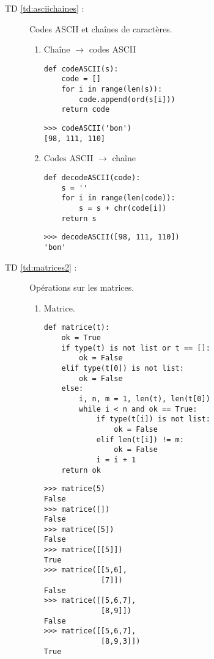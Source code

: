 \begin{description}
\item[TD \ref{td:asciichaines} :] Codes ASCII et chaînes de caractères.
\begin{enumerate}
\item Chaîne $\rightarrow$ codes ASCII
	
\begin{py}{6cm}
\begin{verbatim}
def codeASCII(s):
    code = []
    for i in range(len(s)):
        code.append(ord(s[i]))
    return code
\end{verbatim}
\end{py}
\hfill
\begin{py}{6cm}
\begin{verbatim}
>>> codeASCII('bon')
[98, 111, 110]
\end{verbatim}
\end{py}
\vspace*{2mm}

\item Codes ASCII $\rightarrow$ chaîne

\begin{py}{6cm}
\begin{verbatim}
def decodeASCII(code):
    s = ''
    for i in range(len(code)):
        s = s + chr(code[i])
    return s
\end{verbatim}
\end{py}
\hfill
\begin{py}{6cm}
\begin{verbatim}
>>> decodeASCII([98, 111, 110])
'bon'
\end{verbatim}
\end{py}
\vspace*{2mm}

\end{enumerate}

\item[TD \ref{td:matrices2} :] Opérations sur les matrices.\\
\begin{enumerate}
\item Matrice.

\begin{py}{6cm}
\begin{verbatim}
def matrice(t):
    ok = True
    if type(t) is not list or t == []:
        ok = False
    elif type(t[0]) is not list: 
        ok = False
    else:
        i, n, m = 1, len(t), len(t[0])
        while i < n and ok == True:
            if type(t[i]) is not list:
                ok = False
            elif len(t[i]) != m: 
                ok = False
            i = i + 1
    return ok
\end{verbatim}
\end{py}
\hfill
\begin{py}{6cm}
\begin{verbatim}
>>> matrice(5)
False
>>> matrice([])
False
>>> matrice([5])
False
>>> matrice([[5]])
True
>>> matrice([[5,6],
             [7]])
False
>>> matrice([[5,6,7],
             [8,9]])
False
>>> matrice([[5,6,7],
             [8,9,3]])
True
\end{verbatim}
\end{py}
\vspace*{2mm}


\end{enumerate}
\end{description}
